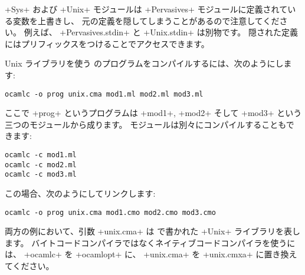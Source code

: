 \ml+Sys+ および \ml+Unix+ モジュールは \ml+Pervasives+ モジュールに定義されている変数を上書きし、
元の定義を隠してしまうことがあるので注意してください。
例えば、 \ml+Pervasives.stdin+ と \ml+Unix.stdin+ は別物です。
隠された定義にはプリフィックスをつけることでアクセスできます。

Unix ライブラリを使う \ocaml のプログラムをコンパイルするには、次のようにします:
%
\begin{lstlisting}
ocamlc -o prog unix.cma mod1.ml mod2.ml mod3.ml
\end{lstlisting}
%
ここで \ml+prog+ というプログラムは \ml+mod1+, \ml+mod2+ そして \ml+mod3+ という三つのモジュールから成ります。
モジュールは別々にコンパイルすることもできます:
%
\begin{lstlisting}
ocamlc -c mod1.ml
ocamlc -c mod2.ml
ocamlc -c mod3.ml
\end{lstlisting}
%
この場合、次のようにしてリンクします:
%
\begin{lstlisting}
ocamlc -o prog unix.cma mod1.cmo mod2.cmo mod3.cmo
\end{lstlisting}
%
両方の例において、引数 \ml+unix.cma+ は \ocaml で書かれた \ml+Unix+ ライブラリを表します。
バイトコードコンパイラではなくネイティブコードコンパイラを使うには、 \ml+ocamlc+ を \ml+ocamlopt+ に、
\ml+unix.cma+ を \ml+unix.cmxa+ に置き換えてください。


